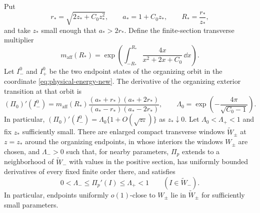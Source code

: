 \begin{lemma}
\label{lem:exterior-multiplier-new}
Put
\[
 r_*=\sqrt{2z_*+C_0z_*^2},\qquad a_*=1+C_0z_*,
 \qquad R_*=\frac{r_*}{z_*},
\]
and take $z_*$ small enough that $a_*>2r_*$.  Define the finite-section
transverse multiplier
\[
 m_{\mathrm{aff}}(R_*)=
 \exp\!\left(\int_{-R_*}^{R_*}
       \frac{4x}{x^2+2x+C_0}\,\dd x\right).
\]
Let $I_-^0$ and $I_+^0$ be the two endpoint states of the organizing orbit
in the coordinate \eqref{eq:physical-energy-new}.  The derivative of the
organizing exterior transition at that orbit is
\begin{equation}
\label{eq:exterior-multiplier-new}
 (\Pi_0)'(I_-^0)=
 m_{\mathrm{aff}}(R_*)\frac{(a_*+r_*)(a_*+2r_*)}
                    {(a_*-r_*)(a_*-2r_*)},
 \qquad
 \Lambda_0=\exp\!\left(-\frac{4\pi}{\sqrt{C_0-1}}\right).
\end{equation}
In particular, $(\Pi_0)'(I_-^0)=\Lambda_0\{1+O(\sqrt{z_*})\}$ as
$z_*\downarrow0$.
Let $\Lambda_0<\Lambda_+<1$ and fix $z_*$ sufficiently small. There are
enlarged compact transverse windows \(\widetilde W_\pm\) at \(z=z_*\)
around the organizing endpoints, in whose interiors the windows \(W_\pm\)
are chosen, and \(\Lambda_->0\) such that, for nearby parameters,
\(\Pi_p\) extends to a neighborhood of \(\widetilde W_-\) with values in
the positive section, has uniformly bounded derivatives of every fixed
finite order there, and satisfies
\begin{equation}
\label{eq:exterior-uniform-contraction-new}
 0<\Lambda_-\le\Pi_p'(I)\le\Lambda_+<1\qquad(I\in\widetilde W_-).
\end{equation}
In particular, endpoints uniformly \(o(1)\)-close to \(W_\pm\) lie in
\(\widetilde W_\pm\) for sufficiently small parameters.
\end{lemma}

